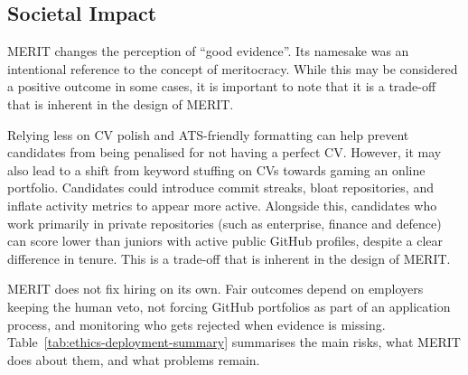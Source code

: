 \subsection{Societal Impact}
\label{sec:societal-impact}

MERIT changes the perception of ``good evidence''. Its namesake was an intentional reference to the concept of meritocracy.
While this may be considered a positive outcome in some cases, it is important to note that it is a trade-off that is inherent in the design of MERIT.

Relying less on CV polish and ATS-friendly formatting can help prevent candidates from being penalised for not having a perfect CV.
However, it may also lead to a shift from keyword stuffing on CVs towards gaming an online portfolio. Candidates could introduce
commit streaks, bloat repositories, and inflate activity metrics to appear more active. Alongside this, candidates who work primarily
in private repositories (such as enterprise, finance and defence) can score lower than juniors with active public GitHub profiles,
despite a clear difference in tenure. This is a trade-off that is inherent in the design of MERIT.

MERIT does not fix hiring on its own. Fair outcomes depend on employers keeping the human veto, not forcing GitHub portfolios as part of
an application process, and monitoring who gets rejected when evidence is missing.
Table~\ref{tab:ethics-deployment-summary} summarises the main risks, what MERIT does about them, and what problems remain.

